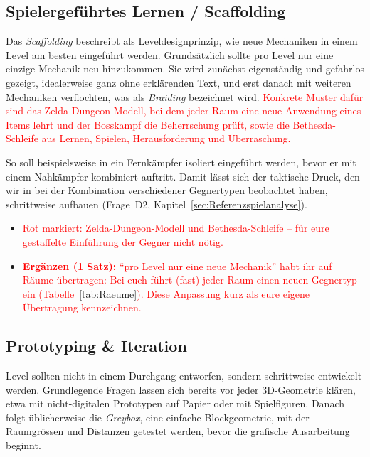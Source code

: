 \documentclass[../Main.tex]{subfiles}
\begin{document}
\subsection{Spielergeführtes Lernen / Scaffolding} \label{sec:Scaffolding}
Das \textit{Scaffolding} beschreibt als Leveldesignprinzip, wie neue Mechaniken in einem Level am besten eingeführt werden.\autocite[114]{totten2014architectural} Grundsätzlich sollte pro Level nur eine einzige Mechanik neu hinzukommen.\autocite{gdc_tenprinciples2010} Sie wird zunächst eigenständig und gefahrlos gezeigt, idealerweise ganz ohne erklärenden Text, und erst danach mit weiteren Mechaniken verflochten, was als \textit{Braiding} bezeichnet wird.\autocite{gdc_movingmountains2020} \textcolor{red}{Konkrete Muster dafür sind das Zelda-Dungeon-Modell, bei dem jeder Raum eine neue Anwendung eines Items lehrt und der Bosskampf die Beherrschung prüft, sowie die Bethesda-Schleife aus Lernen, Spielen, Herausforderung und Überraschung.\autocite{gdc_tenprinciples2010}}

So soll beispielsweise in  ein Fernkämpfer isoliert eingeführt werden, bevor er mit einem Nahkämpfer kombiniert auftritt. Damit lässt sich der taktische Druck, den wir in  bei der Kombination verschiedener Gegnertypen beobachtet haben, schrittweise aufbauen (Frage~D2, Kapitel~\ref{sec:Referenzspielanalyse}).

\begin{itemize}[leftmargin=1.5cm]
    \item \textcolor{red}{Rot markiert: Zelda-Dungeon-Modell und Bethesda-Schleife -- für eure gestaffelte Einführung der Gegner nicht nötig.}
    \item \textcolor{red}{\textbf{Ergänzen (1 Satz):} \enquote{pro Level nur eine neue Mechanik} habt ihr auf Räume übertragen: Bei euch führt (fast) jeder Raum einen neuen Gegnertyp ein (Tabelle~\ref{tab:Raeume}). Diese Anpassung kurz als eure eigene Übertragung kennzeichnen.}
\end{itemize}

\subsection{Prototyping \& Iteration} \label{sec:Prototyping}
Level sollten nicht in einem Durchgang entworfen, sondern schrittweise entwickelt werden. Grundlegende Fragen lassen sich bereits vor jeder 3D-Geometrie klären, etwa mit nicht-digitalen Prototypen auf Papier oder mit Spielfiguren. Danach folgt üblicherweise die \textit{Greybox}, eine einfache Blockgeometrie, mit der Raumgrössen und Distanzen getestet werden, bevor die grafische Ausarbeitung beginnt.\autocite[124--126]{totten2014architectural}
\end{document}
